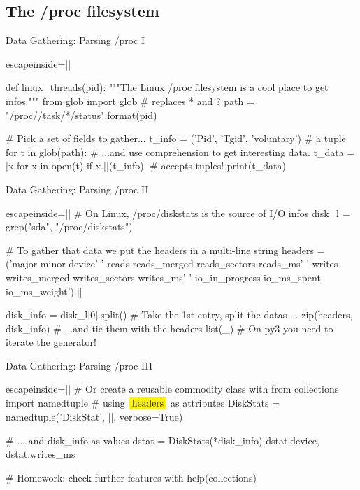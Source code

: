 \subsection{The /proc filesystem}
\begin{pyframe}{Data Gathering: Parsing /proc I}
\begin{pycode*}{escapeinside=||}

def linux_threads(pid):
  """The Linux /proc filesystem is a cool place to get infos."""
  from glob import glob  # replaces * and ?
  path = "/proc/{}/task/*/status".format(pid)
  
  # Pick a set of fields to gather...
  t_info = ('Pid', 'Tgid', 'voluntary') # a tuple
  for t in glob(path):
    # ...and use comprehension to get interesting data.
    t_data = [x for x in open(t) 
        if x.||(t_info)] #  accepts tuples!
    print(t_data)
\end{pycode*}
\end{pyframe}



\begin{pyframe}{Data Gathering: Parsing /proc II}
\begin{pycode*}{escapeinside=||}
# On Linux, /proc/diskstats is the source of I/O infos
disk_l = grep("sda", "/proc/diskstats")

# To gather that data we put the headers in a multi-line string
headers = ('major minor device'
        ' reads reads_merged reads_sectors reads_ms'
        ' writes writes_merged writes_sectors writes_ms'
        ' io_in_progress io_ms_spent io_ms_weight').||
        
disk_info = disk_l[0].split() # Take the 1st entry, split the datas ...
zip(headers, disk_info)          # ...and tie them with the headers
list(_) # On py3 you need to iterate the generator!
\end{pycode*}
\end{pyframe}

\begin{pyframe}{Data Gathering: Parsing /proc III}
\begin{pycode*}{escapeinside=||}
# Or create a reusable commodity class with
from collections import namedtuple
# using $\pyver{headers}$ as attributes
DiskStats = namedtuple('DiskStat', ||, verbose=True)

# ... and disk_info as values
dstat = DiskStats(*disk_info)
dstat.device, dstat.writes_ms

# Homework: check further features with
help(collections) 
\end{pycode*}
\end{pyframe}


\iffalse
\begin{pyframe}{Data Gathering: subprocess}
\begin{pycode}
# foo
\end{pycode}
\end{pyframe}

\fi
